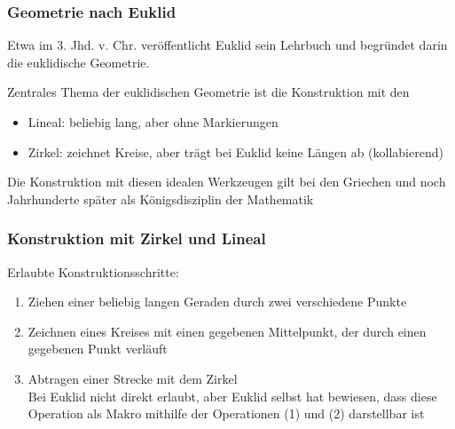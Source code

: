 \documentclass[aspectratio=1610,onlymath]{beamer}
\begin{document}
\begin{frame}\frametitle{Geometrie nach Euklid}

Etwa im 3. Jhd. v. Chr. veröffentlicht Euklid sein Lehrbuch 
 und begründet darin die euklidische Geometrie.
\bigskip

Zentrales Thema der euklidischen Geometrie ist die
Konstruktion mit den 

\begin{itemize}
\item \alert{Lineal:} beliebig lang, aber ohne Markierungen
\item \alert{Zirkel:} zeichnet Kreise, aber trägt bei Euklid keine Längen ab (kollabierend)
\end{itemize}

Die Konstruktion mit diesen idealen Werkzeugen gilt bei den Griechen und noch
Jahrhunderte später als Königsdisziplin der Mathematik

\end{frame}

\begin{frame}\frametitle{Konstruktion mit Zirkel und Lineal}


\alert{Erlaubte Konstruktionsschritte:}
\begin{enumerate}[(1)]
\item Ziehen einer beliebig langen Geraden durch zwei verschiedene Punkte
\item Zeichnen eines Kreises mit einen gegebenen Mittelpunkt, der durch einen gegebenen Punkt verläuft
\item Abtragen einer Strecke mit dem Zirkel\\
{\tiny Bei Euklid nicht direkt erlaubt, aber Euklid selbst hat bewiesen, dass diese Operation als Makro mithilfe der Operationen (1) und (2) darstellbar ist
}
\end{enumerate}


\end{frame}
\end{document}

